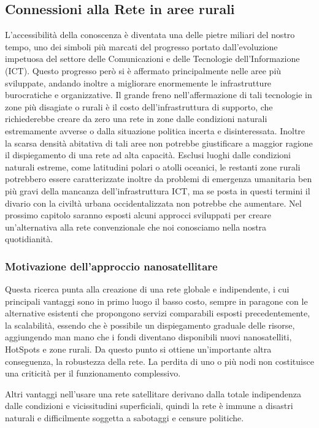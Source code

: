 \documentclass[a4paper]{article}
\begin{document}
		
		\subsection{Connessioni alla Rete in aree rurali}
			
		L'accessibilità della conoscenza è diventata una delle pietre miliari del nostro tempo, uno dei simboli più marcati del progresso portato dall'evoluzione impetuosa del settore delle Comunicazioni e delle Tecnologie dell'Informazione (ICT). Questo progresso però si è affermato principalmente nelle aree più sviluppate, andando inoltre a migliorare enormemente le infrastrutture burocratiche e organizzative. Il grande freno nell'affermazione di tali tecnologie in zone più disagiate o rurali è il costo dell'infrastruttura di supporto, che richiederebbe creare da zero una rete in zone dalle condizioni naturali estremamente avverse o dalla situazione politica incerta e disinteressata. Inoltre la scarsa densità abitativa di tali aree non potrebbe giustificare a maggior ragione il dispiegamento di una rete ad alta capacità. Esclusi luoghi dalle condizioni naturali estreme, come latitudini polari o atolli oceanici, le restanti zone rurali potrebbero essere caratterizzate inoltre da problemi di emergenza umanitaria ben più gravi della mancanza dell'infrastruttura ICT, ma se posta in questi termini il divario con la civiltà urbana occidentalizzata non potrebbe che aumentare. Nel prossimo capitolo saranno esposti alcuni approcci sviluppati per creare un'alternativa alla rete convenzionale che noi conosciamo nella nostra quotidianità.
			
				\subsubsection{Motivazione dell'approccio nanosatellitare}			
					
				Questa ricerca punta alla creazione di una rete globale e indipendente, i cui principali vantaggi sono in primo luogo il basso costo, sempre in paragone con le alternative esistenti che propongono servizi comparabili esposti precedentemente, la scalabilità, essendo che è possibile un dispiegamento graduale delle risorse, aggiungendo man mano che i fondi diventano disponibili nuovi nanosatelliti, HotSpots e zone rurali. Da questo punto si ottiene un'importante altra conseguenza, la robustezza della rete. La perdita di uno o più nodi non costituisce una criticità per il funzionamento complessivo. 
					
				Altri vantaggi nell'usare una rete satellitare derivano dalla totale indipendenza dalle condizioni e vicissitudini superficiali, quindi la rete è immune a disastri naturali e difficilmente soggetta a sabotaggi e censure politiche.
					
\end{document}
